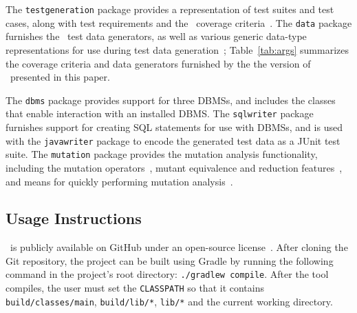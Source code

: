 

The \texttt{testgeneration} package provides a representation of test suites and test cases, along with test
requirements and the \numcoveragecriteria~coverage criteria~\cite{mcminn2015effectiveness}. The \texttt{data} package
furnishes the \numdatagenerators~test data generators, as well as various generic data-type representations for use
during test data generation~\cite{mcminn2015effectiveness}; Table~\ref{tab:args} summarizes the coverage criteria and
data generators furnished by the the version of \sa~presented in this paper.


The \texttt{dbms} package provides support for three DBMSs, and includes the classes that enable interaction with an
installed DBMS\@. The \texttt{sqlwriter} package furnishes support for creating SQL statements for use with DBMSs, and is
used with the \texttt{javawriter} package to encode the generated test data as a JUnit test suite.  The
\texttt{mutation} package provides the mutation analysis functionality, including the mutation
operators~\cite{wright2015mutation}, mutant equivalence and reduction features~\cite{wright2014impact}, and means for
quickly performing mutation analysis~\cite{mcminn2016virtual}.

\subsection{Usage Instructions}



\sa~is publicly available on GitHub under an open-source license~\cite{tool}.
After cloning the Git repository, the project can be built using Gradle by
running the following command in the project's root directory:
\lstinline{./gradlew compile}. After the tool compiles, the user must set the
\lstinline{CLASSPATH} so that it contains \lstinline{build/classes/main},
\lstinline{build/lib/*}, \lstinline{lib/*} and the current working directory.

